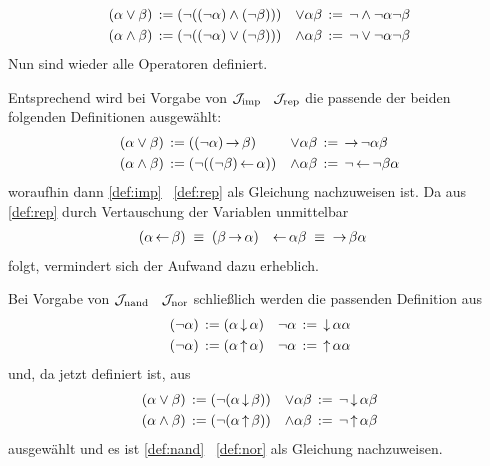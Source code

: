 \begin{align}
	(\alpha \lor \beta)  & \;\operatorname{:\!\operatorname{=}}\; (\lnot((\lnot\alpha)\land(\lnot\beta))) &
	\lor \alpha  \beta   & \;\operatorname{:\!\operatorname{=}}\;  \lnot \land \lnot \alpha \lnot \beta
	\label{def:orand} \\
	(\alpha \land \beta) & \;\operatorname{:\!\operatorname{=}}\; (\lnot((\lnot\alpha)\lor(\lnot\beta)))  &
	\land \alpha  \beta  & \;\operatorname{:\!\operatorname{=}}\;  \lnot \lor \lnot \alpha \lnot \beta
	\label{def:andor}
\end{align}
Nun sind wieder alle Operatoren definiert.

Entsprechend wird bei Vorgabe von $\mathcal{J}_{\mathrm{imp}}$ \textbzgl\ $\mathcal{J}_{\mathrm{rep}}$ die passende der beiden folgenden Definitionen ausgewählt:
\begin{align}
	(\alpha \lor  \beta) & \;\operatorname{:\!\operatorname{=}}\; ((\lnot \alpha) \operatorname{\rightarrow} \beta)         &
	\lor \alpha   \beta  & \;\operatorname{:\!\operatorname{=}}\;   \operatorname{\rightarrow} \lnot \alpha \beta
	\label{def:orrep}
	\\
	(\alpha \land \beta) & \;\operatorname{:\!\operatorname{=}}\; (\lnot ((\lnot \beta) \operatorname{\leftarrow} \alpha)) &
	\land \alpha  \beta  & \;\operatorname{:\!\operatorname{=}}\;  \lnot \operatorname{\leftarrow} \lnot \beta \alpha
	\label{def:andrep}
\end{align}
woraufhin dann \eqref{def:imp} \textbzgl\ \eqref{def:rep} als Gleichung nachzuweisen ist.
Da aus \eqref{def:rep} durch Vertauschung der Variablen unmittelbar
\begin{align}
	(\alpha \operatorname{\leftarrow} \beta) & \;\equiv\; (\beta \operatorname{\rightarrow} \alpha) &
	\operatorname{\leftarrow} \alpha  \beta  & \;\equiv\;  \operatorname{\rightarrow} \beta \alpha  \label{eq:repimp}
\end{align}
folgt, vermindert sich der Aufwand dazu erheblich.

Bei Vorgabe von $\mathcal{J}_{\mathrm{nand}}$ \textbzgl\ $\mathcal{J}_{\mathrm{nor}}$ schließlich werden die passenden Definition aus
\begin{align}
	(\lnot \alpha) & \;\operatorname{:\!\operatorname{=}}\; (\alpha \operatorname{\downarrow} \alpha)  &
	\lnot  \alpha  & \;\operatorname{:\!\operatorname{=}}\;  \operatorname{\downarrow} \alpha \alpha   \label{def:notnor} \\
	(\lnot \alpha) & \;\operatorname{:\!\operatorname{=}}\; (\alpha \operatorname{\uparrow} \alpha) &
	\lnot  \alpha  & \;\operatorname{:\!\operatorname{=}}\;  \operatorname{\uparrow} \alpha \alpha  \label{def:notnand}
\end{align}
und, da \symqt{\lnot} jetzt definiert ist, aus
\begin{align}
	(\alpha \lor \beta)  & \;\operatorname{:\!\operatorname{=}}\; (\lnot(\alpha \operatorname{\downarrow} \beta))  &
	\lor \alpha  \beta   & \;\operatorname{:\!\operatorname{=}}\;  \lnot \operatorname{\downarrow} \alpha \beta
	\label{def:ornor} \\
	(\alpha \land \beta) & \;\operatorname{:\!\operatorname{=}}\; (\lnot(\alpha \operatorname{\uparrow} \beta)) &
	\land \alpha  \beta  & \;\operatorname{:\!\operatorname{=}}\;  \lnot \operatorname{\uparrow} \alpha \beta
	\label{def:andnand}
\end{align}
ausgewählt und es ist \eqref{def:nand} \textbzgl\ \eqref{def:nor} als Gleichung nachzuweisen.

